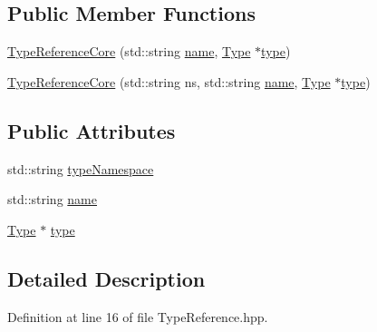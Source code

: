 \subsection*{Public Member Functions}
\begin{DoxyCompactItemize}
\item 
\hyperlink{struct_scribble_core_1_1_type_reference_core_ab9c58f694c3163be584e819417bbfca9}{Type\-Reference\-Core} (std\-::string \hyperlink{struct_scribble_core_1_1_type_reference_core_a0e2f05945e7ee59784a6b61865653df8}{name}, \hyperlink{class_scribble_core_1_1_type}{Type} $\ast$\hyperlink{struct_scribble_core_1_1_type_reference_core_a0e0faeee3a107ae76ebe27c3d678d1a9}{type})
\item 
\hyperlink{struct_scribble_core_1_1_type_reference_core_a5d26723df27dc125c4cf11c563d24a4e}{Type\-Reference\-Core} (std\-::string ns, std\-::string \hyperlink{struct_scribble_core_1_1_type_reference_core_a0e2f05945e7ee59784a6b61865653df8}{name}, \hyperlink{class_scribble_core_1_1_type}{Type} $\ast$\hyperlink{struct_scribble_core_1_1_type_reference_core_a0e0faeee3a107ae76ebe27c3d678d1a9}{type})
\end{DoxyCompactItemize}
\subsection*{Public Attributes}
\begin{DoxyCompactItemize}
\item 
std\-::string \hyperlink{struct_scribble_core_1_1_type_reference_core_ac57d9db0ac167c1fdc653985bb4892ca}{type\-Namespace}
\item 
std\-::string \hyperlink{struct_scribble_core_1_1_type_reference_core_a0e2f05945e7ee59784a6b61865653df8}{name}
\item 
\hyperlink{class_scribble_core_1_1_type}{Type} $\ast$ \hyperlink{struct_scribble_core_1_1_type_reference_core_a0e0faeee3a107ae76ebe27c3d678d1a9}{type}
\end{DoxyCompactItemize}


\subsection{Detailed Description}


Definition at line 16 of file Type\-Reference.\-hpp.



